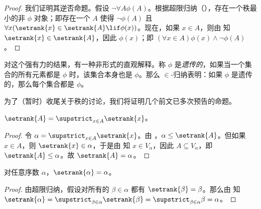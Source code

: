 \documentclass[../../../include/open-logic-section]{subfiles}
\begin{document}
\begin{proof}
我们证明其逆否命题。假设 $\lnot \forall A \phi(A)$。根据超限归纳（），存在一个秩最小的非 $\phi$ 对象；即存在一个 $A$ 使得 $\lnot \phi(A)$ 且 $\forall x(\setrank{x} \in \setrank{A}
\lif \phi(x))$。现在，如果 $x \in A$，则由  知 $\setrank{x} \in \setrank{A}$，因此 $\phi(x)$；即 $(\forall x \in
A)\phi(x) \land \lnot \phi(A)$。
\end{proof}\noindent 对这个强有力的结果，有一种非形式的直观解释。称 $\phi$ 是\emph{遗传的}，如果当一个集合的所有元素都是 $\phi$ 时，该集合本身也是 $\phi$。那么 $\in$-归纳表明：如果 $\phi$ 是遗传的，那么每个集合都是 $\phi$。

为了（暂时）收尾关于秩的讨论，我们将证明几个前文已多次预告的命题。

\begin{prop}
$\setrank{A} = \supstrict_{x \in A}\setrank{x}$。
\end{prop}

\begin{proof}
令 $\alpha = \supstrict_{x \in A}\setrank{x}$。由 ，$\alpha \leq \setrank{A}$。但如果 $x \in A$，则 $\setrank{x} \in \alpha$，于是由  知 $x \in V_\alpha$，因此 $A \subseteq V_\alpha$，即 $\setrank{A} \leq \alpha$。故 $\setrank{A} = \alpha$。
\end{proof}

\begin{cor}
对任意序数 $\alpha$，$\setrank{\alpha} = \alpha$。
\end{cor}

\begin{proof}
由超限归纳，假设对所有的 $\beta \in \alpha$ 都有 $\setrank{\beta} = \beta$。那么由  知 $\setrank{\alpha} = \supstrict_{\beta \in
\alpha}\setrank{\beta} = \supstrict_{\beta \in \alpha}\beta = \alpha$。
%
\end{proof}
\end{document}
